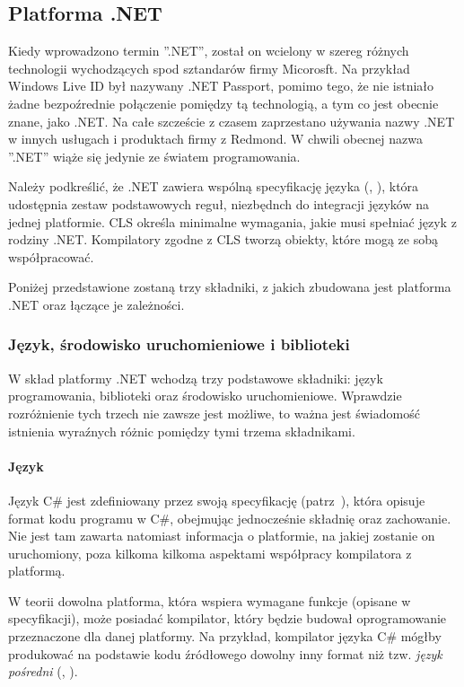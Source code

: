 \subsection{Platforma .NET}
Kiedy wprowadzono termin ''.NET'', został on wcielony w szereg różnych technologii wychodzących spod sztandarów firmy Micorosft. Na przykład Windows Live ID był nazywany .NET Passport, pomimo tego, że nie istniało żadne bezpoźrednie połączenie pomiędzy tą technologią, a tym co jest obecnie znane, jako .NET. Na całe szczeście z czasem zaprzestano używania nazwy .NET w innych usługach i produktach firmy z Redmond. W chwili obecnej nazwa ''.NET'' wiąże się jedynie ze światem programowania.

Należy podkreślić, że .NET zawiera wspólną specyfikację języka (, ), która udostępnia zestaw podstawowych reguł, niezbędnch do integracji języków na jednej platformie. CLS określa minimalne wymagania, jakie musi spełniać język z rodziny .NET. Kompilatory zgodne z CLS tworzą obiekty, które mogą ze sobą współpracować.

Poniżej przedstawione zostaną trzy składniki, z jakich zbudowana jest platforma .NET oraz łączące je zależności.

\subsubsection{Język, środowisko uruchomieniowe i biblioteki}
W skład platformy .NET wchodzą trzy podstawowe składniki: język programowania, biblioteki oraz środowisko uruchomieniowe. Wprawdzie rozróżnienie tych trzech nie zawsze jest możliwe, to ważna jest świadomość istnienia wyraźnych różnic pomiędzy tymi trzema składnikami.

\paragraph{Język}
Język C\# jest zdefiniowany przez swoją specyfikację (patrz~\cite{cSharp:spec}), która opisuje format kodu programu w C\#, obejmując jednocześnie składnię oraz zachowanie. Nie jest tam zawarta natomiast informacja o platformie, na jakiej zostanie on uruchomiony, poza kilkoma kilkoma aspektami współpracy kompilatora z platformą. 

W teorii dowolna platforma, która wspiera wymagane funkcje (opisane w specyfikacji), może posiadać kompilator, który będzie budował oprogramowanie przeznaczone dla danej platformy.  Na przykład, kompilator języka C\# mógłby produkować na podstawie kodu źródłowego dowolny inny format niż tzw. \emph{język pośredni} (, ).

